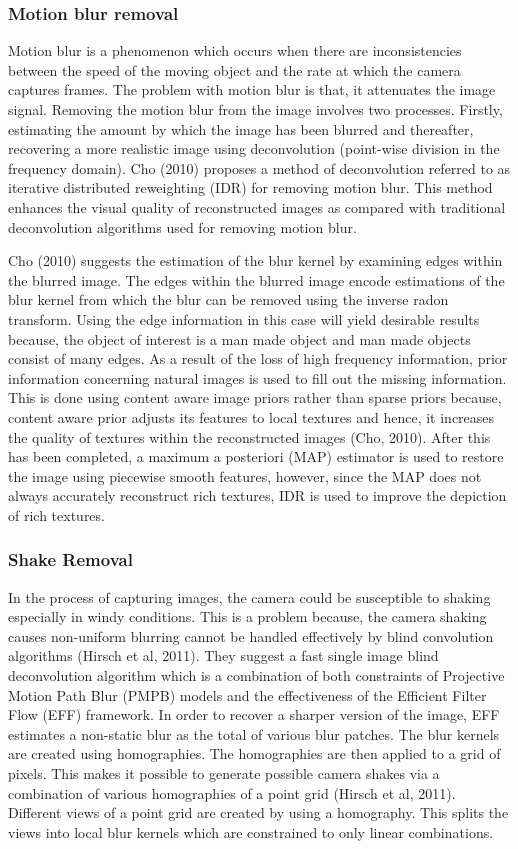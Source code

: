 \documentclass[a4paper, 12pt]{article}
\begin{document}
\subsubsection{ Motion blur removal}

Motion blur is a phenomenon which occurs when there are inconsistencies between the speed of the moving object and the rate at which the camera captures frames. The problem with motion blur is that, it attenuates the image signal. Removing the motion blur from the image involves two processes. Firstly, estimating the amount by which the image has been blurred and thereafter, recovering a more realistic image using  deconvolution (point-wise division in the frequency domain). Cho (2010) proposes a method of deconvolution referred to as iterative distributed reweighting (IDR) for removing motion blur. This method enhances the visual quality of reconstructed images as compared with traditional deconvolution algorithms used for removing motion blur.
\parskip 0.2in 

Cho (2010) suggests the estimation of the blur kernel by examining edges within the blurred image. The edges within the blurred image encode estimations of the blur kernel from which the blur can be removed using the inverse radon transform. Using the edge information in this case will yield desirable results because, the object of interest is a man made object and man made objects consist of many edges. As a result of the loss of high frequency information, prior information concerning natural images is used to fill out the missing information. This is done using content aware image priors rather than sparse priors because, content aware prior adjusts its features to local textures and hence, it increases the quality of textures within the reconstructed images (Cho, 2010). After this has been completed, a maximum a posteriori (MAP) estimator is used to restore the image using piecewise smooth features, however, since the MAP does not always accurately reconstruct rich textures, IDR is used to improve the depiction of rich textures. 

\subsubsection{Shake Removal}
In the process of capturing images, the camera could be susceptible to shaking especially in windy conditions. This is a problem because, the camera shaking causes non-uniform blurring cannot be handled effectively by blind convolution algorithms (Hirsch et al, 2011). They suggest a fast single image  blind deconvolution algorithm which is a combination of both constraints of Projective Motion Path Blur (PMPB) models and the effectiveness of the Efficient Filter Flow (EFF) framework. In order to recover a sharper version of the image, EFF estimates a non-static blur as the total of various blur patches. The blur kernels are created using homographies. The homographies are then applied to a grid of pixels. This makes it possible to generate possible camera shakes via a combination of various homographies of a point grid (Hirsch et al, 2011). Different views of a point grid are created by using a homography. This splits the views into local blur kernels which are constrained to only linear combinations. 
\end{document}

